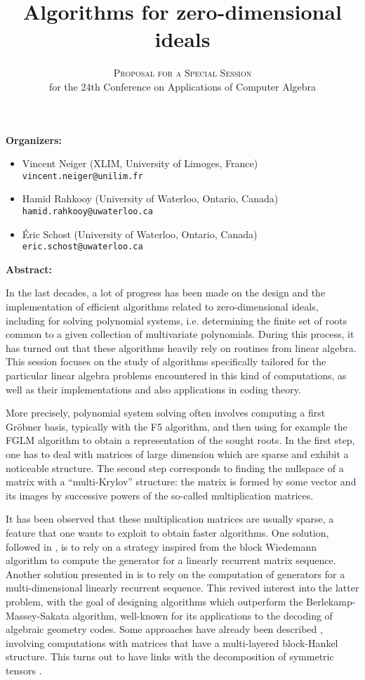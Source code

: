 \documentclass[12pt,english]{article}
\title{Algorithms for zero-dimensional ideals}
\author{\textsc{Proposal for a Special Session} \\
  for the 24th Conference on Applications of Computer Algebra}
\date{}
\begin{document}
\maketitle

\textbf{Organizers:}
\begin{itemize}
  \item Vincent Neiger (XLIM, University of Limoges, France) \\
    {\small \verb+vincent.neiger@unilim.fr+}
  \item Hamid Rahkooy (University of Waterloo, Ontario, Canada) \\
    {\small \verb+hamid.rahkooy@uwaterloo.ca+}
  \item \'Eric Schost (University of Waterloo, Ontario, Canada) \\
    {\small \texttt{eric.schost@uwaterloo.ca}}
\end{itemize}

\textbf{Abstract:}

In the last decades, a lot of progress has been made on the design and the
implementation of efficient algorithms related to zero-dimensional ideals,
including for solving polynomial systems, i.e. determining the finite set of
roots common to a given collection of multivariate polynomials.  During this
process, it has turned out that these algorithms heavily rely on routines from
linear algebra.  This session focuses on the study of algorithms specifically
tailored for the particular linear algebra problems encountered in this kind of
computations, as well as their implementations and also applications in coding theory.

More precisely, polynomial system solving often involves computing a first
Gr\"obner basis, typically with the F5 algorithm, and then using for example
the FGLM algorithm \cite{FaGiLaMo93} to obtain a representation of the sought
roots.  In the first step, one has to deal with matrices of large dimension
which are sparse and exhibit a noticeable structure.  The second step
corresponds to finding the nullspace of a matrix with a ``multi-Krylov''
structure: the matrix is formed by some vector and its images by successive
powers of the so-called multiplication matrices.

It has been observed that these multiplication matrices are usually sparse, a
feature that one wants to exploit to obtain faster algorithms.  One solution,
followed in \cite{Steel15}, is to rely on a strategy inspired from the block
Wiedemann algorithm \cite{Coppersmith94,Villard97a} to compute the generator
for a linearly recurrent matrix sequence.  Another solution presented in
\cite{FaMo17} is to rely on the computation of generators for a
multi-dimensional linearly recurrent sequence.  This revived interest into the
latter problem, with the goal of designing algorithms which outperform the
Berlekamp-Massey-Sakata algorithm, well-known for its applications to the
decoding of algebraic geometry codes.  Some approaches have already been
described \cite{BerBoyFau17,Mourrain17}, involving computations with matrices
that have a multi-layered block-Hankel structure.  This turns out to have links
with the decomposition of symmetric tensors \cite{BrCoMots10}.
\end{document}
